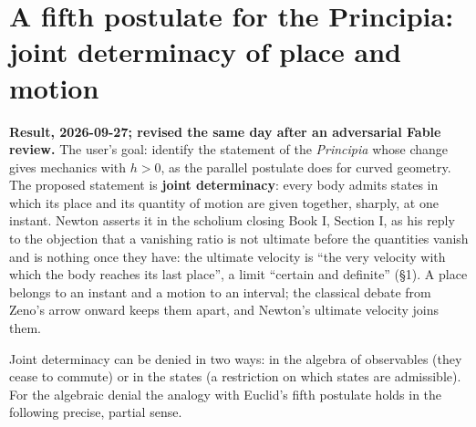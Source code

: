 \documentclass[11pt,a4paper]{article}
\begin{document}
\hypertarget{a-fifth-postulate-for-the-principia-joint-determinacy-of-place-and-motion}{%
\section{A fifth postulate for the Principia: joint determinacy of place
and
motion}\label{a-fifth-postulate-for-the-principia-joint-determinacy-of-place-and-motion}}

\textbf{Result, 2026-09-27; revised the same day after an adversarial
Fable review.} The user's goal: identify the statement of the
\emph{Principia} whose change gives mechanics with \(h>0\), as the
parallel postulate does for curved geometry. The proposed statement is
\textbf{joint determinacy}: every body admits states in which its place
and its quantity of motion are given together, sharply, at one instant.
Newton asserts it in the scholium closing Book I, Section I, as his
reply to the objection that a vanishing ratio is not ultimate before the
quantities vanish and is nothing once they have: the ultimate velocity
is ``the very velocity with which the body reaches its last place'', a
limit ``certain and definite'' (§1). A place belongs to an instant and a
motion to an interval; the classical debate from Zeno's arrow onward
keeps them apart, and Newton's ultimate velocity joins them.

Joint determinacy can be denied in two ways: in the algebra of
observables (they cease to commute) or in the states (a restriction on
which states are admissible). For the algebraic denial the analogy with
Euclid's fifth postulate holds in the following precise, partial sense.
\end{document}
